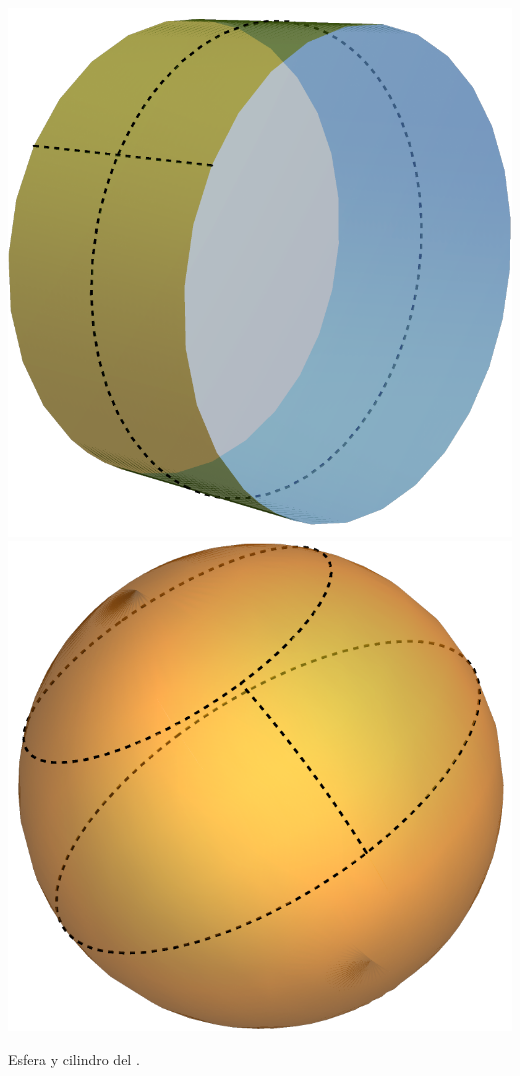 \begin{marginfigure}
\includegraphics{Figures/Cilindro.pdf}
\includegraphics{Figures/Esfera.pdf}
\caption{Esfera y cilindro del . }
\end{marginfigure}

